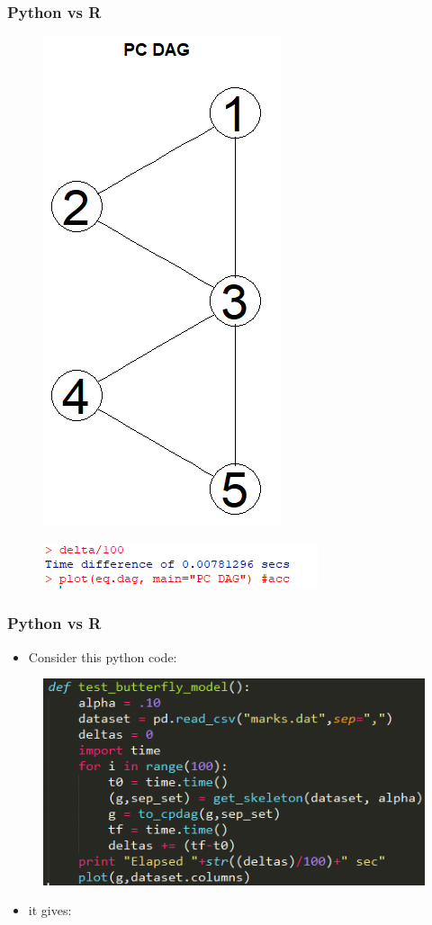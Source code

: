 \documentclass[xcolor ={table,usenames,dvipsnames}]{beamer}
\theoremstyle{definition}
\begin{document}
\begin{frame}
\frametitle{Python vs R}
\begin{figure}[h!]
	\centering
	\includegraphics[scale=0.35]{img/rdag.PNG}
\end{figure}
\begin{figure}[h!]
	\centering
	\includegraphics[scale=0.5]{img/rtime}
\end{figure}
\end{frame}
\begin{frame}
\frametitle{Python vs R}
\begin{itemize}
	\item Consider this python code:
	\end{itemize}
\begin{figure}[h!]
	\centering
	\includegraphics[scale=0.7]{img/py.PNG}
\end{figure}
\begin{itemize}
	\item it gives:
\end{itemize}
\end{frame}
\end{document}
